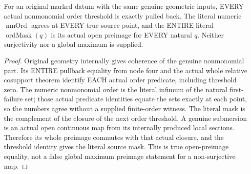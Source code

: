 \begin{theorem}
\label{hir:submersion-relative-parts-actual-order-masks}
\leanok
For an original marked datum with the same genuine geometric inputs,
EVERY actual nonmonomial order threshold is exactly pulled back. The
literal numeric $\operatorname{nmOrd}$ agrees at EVERY true source point,
and the ENTIRE literal $\operatorname{ordMask}(q)$ is its actual open preimage
for EVERY natural $q$. Neither surjectivity nor a global maximum is supplied.
\end{theorem}
\begin{proof}
Original geometry internally gives coherence of the genuine nonmonomial
part. Its ENTIRE pullback equality from node four and the actual whole
relative cosupport theorem identify EACH actual order predicate, including
threshold zero. The numeric nonmonomial order is the literal infimum of
the natural first-failure set; those actual predicate identities equate
the sets exactly at each point, so the numbers agree without a supplied
finite-order witness. The literal mask is the complement of the closure
of the next order threshold. A genuine submersion is an actual open
continuous map from its internally produced local sections. Therefore its
whole preimage commutes with that actual closure, and the threshold identity
gives the literal source mask. This is true open-preimage equality, not a
false global maximum preimage statement for a non-surjective map.
\end{proof}

